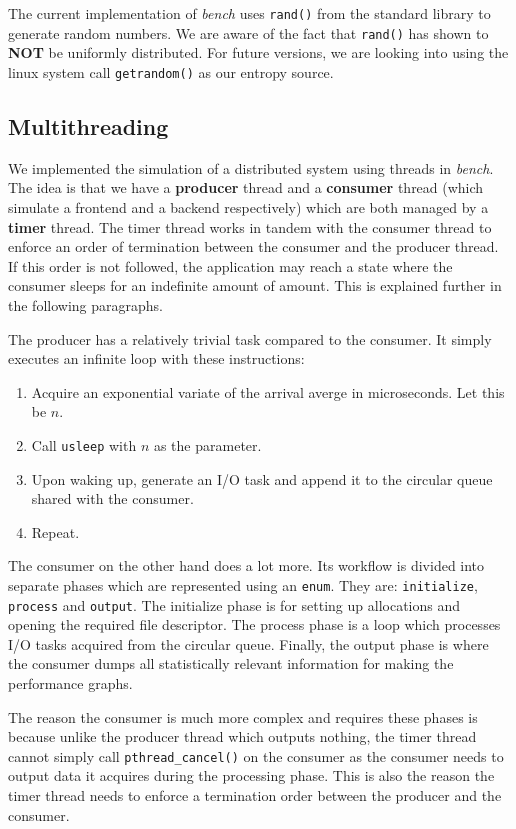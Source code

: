 \documentclass[10pt, author, twocolumn]{article}
\begin{document}
The current implementation of \textit{bench} uses \texttt{rand()} from the standard library to generate random numbers. We are aware of the fact that \texttt{rand()} has shown to \textbf{NOT} be uniformly distributed. For future versions, we are looking into using the linux system call \texttt{getrandom()} as our entropy source. 

\subsection{Multithreading}
We implemented the simulation of a distributed system using threads in \textit{bench}. The idea is that we have a \textbf{producer} thread and a \textbf{consumer} thread (which simulate a frontend and a backend respectively) which are both managed by a \textbf{timer} thread. The timer thread works in tandem with the consumer thread to enforce an order of termination between the consumer and the producer thread. If this order is not followed, the application may reach a state where the consumer sleeps for an indefinite amount of amount. This is explained further in the following paragraphs.

The producer has a relatively trivial task compared to the consumer. It simply executes an infinite loop with these instructions: 

\begin{enumerate}
    \item Acquire an exponential variate of the arrival averge in microseconds. Let this be $n$.
    \item Call \texttt{usleep} with $n$ as the parameter. 
    \item Upon waking up, generate an I/O task and append it to the circular queue shared with the consumer. 
    \item Repeat. 
\end{enumerate}

The consumer on the other hand does a lot more. Its workflow is divided into separate phases which are represented using an \texttt{enum}. They are: \texttt{initialize}, \texttt{process} and \texttt{output}. The initialize phase is for setting up allocations and opening the required file descriptor. The process phase is a loop which processes I/O tasks acquired from the circular queue. Finally, the output phase is where the consumer dumps all statistically relevant information for making the performance graphs. 

The reason the consumer is much more complex and requires these phases is because unlike the producer thread which outputs nothing, the timer thread cannot simply call \texttt{pthread\_cancel()} on the consumer as the consumer needs to output data it acquires during the processing phase. This is also the reason the timer thread needs to enforce a termination order between the producer and the consumer. 
\end{document}
